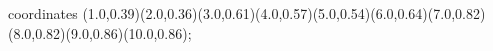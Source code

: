 					coordinates { (1.0,0.39)(2.0,0.36)(3.0,0.61)(4.0,0.57)(5.0,0.54)(6.0,0.64)(7.0,0.82)(8.0,0.82)(9.0,0.86)(10.0,0.86)};